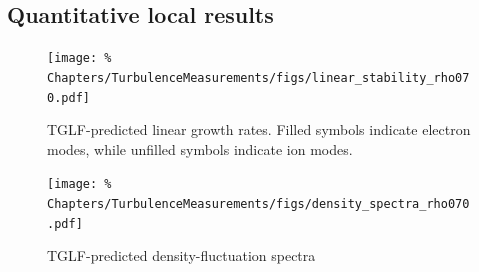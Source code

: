 \subsection{Quantitative local results}
\label{sec:TurbulenceMeasurements:Modeling:local}
\begin{figure}[h!]
  \centering
  \texttt{[image: \%
    Chapters/TurbulenceMeasurements/figs/linear\_stability\_rho070.pdf]}
  \caption[TGLF-predicted linear growth rates]{%
    TGLF-predicted linear growth rates.
    Filled symbols indicate electron modes, while
    unfilled symbols indicate ion modes.
  }
\label{fig:TurbulenceMeasurements:linear_stability}
\end{figure}

\begin{figure}[h!]
  \centering
  \texttt{[image: \%
    Chapters/TurbulenceMeasurements/figs/density\_spectra\_rho070.pdf]}
  \caption[TGLF-predicted density-fluctuation spectra]{%
    TGLF-predicted density-fluctuation spectra
  }
\label{fig:TurbulenceMeasurements:density_spectra}
\end{figure}




